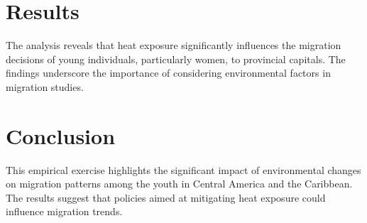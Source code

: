 \documentclass[12pt]{article}
\begin{document}
\section{Results}
The analysis reveals that heat exposure significantly influences the migration decisions of young individuals, particularly women, to provincial capitals. The findings underscore the importance of considering environmental factors in migration studies.

\section{Conclusion}
This empirical exercise highlights the significant impact of environmental changes on migration patterns among the youth in Central America and the Caribbean. The results suggest that policies aimed at mitigating heat exposure could influence migration trends.


% 
\end{document}
